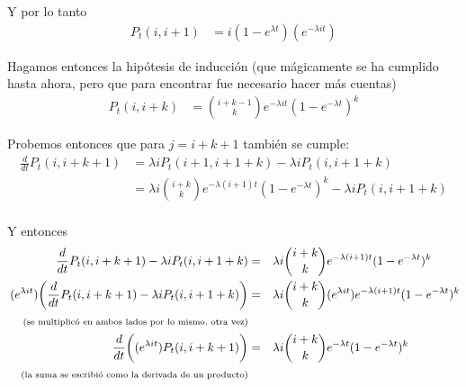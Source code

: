 Y por lo tanto
\begin{align}
       P_t(i, i+1)  &=  i (1-e^{\lambda t})(e^{-\lambda i t})                         
\end{align}\pn

Hagamos entonces la hipótesis de inducción (que mágicamente se ha cumplido hasta ahora, pero que para encontrar fue necesario hacer más cuentas)
\begin{align}
    P_t(i, i+k)     &=  \binom{i + k - 1}{k} e^{-\lambda i t} (1 - e^{- \lambda t})^k    
\end{align}\pn

Probemos entonces que para $j = i + k + 1$ también se cumple:
\begin{align}
    \frac{d}{dt} P_t(i, i + k + 1)  &=  \lambda i P_t(i + 1, i + 1 + k) - \lambda i P_t(i, i + 1 + k)                                    \\
                                    &=  \lambda i \binom{i + k }{k} e^{-\lambda (i + 1) t} (1 - e^{- \lambda t})^k - \lambda i P_t(i, i + 1 + k)   \\
\end{align}\pn

Y entonces
\begin{align}
    \frac{d}{dt} P_t(i, i + k + 1) - \lambda i P_t(i, i + 1 + k)                                    &=&&  \lambda i \binom{i + k}{k} e^{-\lambda (i + 1) t} (1 - e^{- \lambda t})^k                    \\
    (e^{\lambda i t}) \bigg( \frac{d}{dt} P_t(i, i + k + 1) - \lambda i P_t(i, i + 1 + k) \bigg)    &=&&  \lambda i \binom{i + k}{k} (e^{\lambda i t}) e^{-\lambda (i + 1) t} (1 - e^{- \lambda t})^k  \\
    \;\;\;\;\mbox{{\scriptsize(se multiplicó en ambos lados por lo mismo, otra vez)}}                                   & &&                                                                                      \\
    \frac{d}{dt} \bigg((e^{\lambda i t}) P_t(i, i + k + 1)\bigg)                                    &=&&  \lambda i \binom{i + k}{k}  e^{-\lambda t} (1 - e^{- \lambda t})^k                           \\
     \;\;\;\;\mbox{{\scriptsize(la suma se escribió como la derivada de un producto)}}                                  & &&
\end{align}\pn

